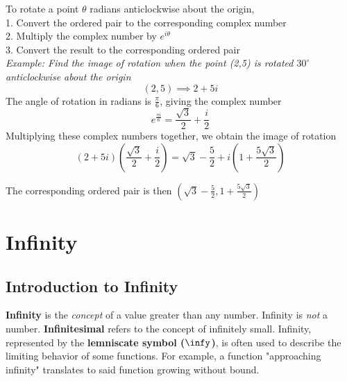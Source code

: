\documentclass{article}
\begin{document}
            \noindent To rotate a point $\theta$ radians anticlockwise about the origin, \\
            1. Convert the ordered pair to the corresponding complex number \\
            2. Multiply the complex number by $e^{i\theta}$ \\
            3. Convert the result to the corresponding ordered pair \\

            \noindent \textit{Example: Find the image of rotation when the point (2,5) is rotated
            $30^\circ$ anticlockwise about the origin} \\
            \begin{equation*}
                (2,5)\implies 2+5i
            \end{equation*}
            \noindent The angle of rotation in radians is $\frac{\pi}{6}$, giving the complex number \\
            \begin{equation*}
                e^{\frac{\pi i}{6}}=\frac{\sqrt{3}}{2}+\frac{i}{2}
            \end{equation*}
            \noindent Multiplying these complex numbers together, we obtain the image of rotation \\
            \begin{equation*}
                \left ( 2+5i\right )\left (\frac{\sqrt{3}}{2}+\frac{i}{2}\right)
                =
                \sqrt{3}-\frac{5}{2}+i \left (1+\frac{5\sqrt{3}}{2} \right )
            \end{equation*}

            \noindent The corresponding ordered pair is then
            $\left(\sqrt{3}-\frac{5}{2},1+\frac{5\sqrt{3}}{2}\right)$

    \pagebreak

    \section{Infinity}

        \subsection{Introduction to Infinity}
            \textbf{Infinity} is the \textit{concept} of a value greater than any number.
            Infinity is \textit{not} a number. \textbf{Infinitesimal} refers to the concept of
            infinitely small. Infinity, represented by the \textbf{lemniscate symbol ($\infy$)}, is
            often used to describe the limiting behavior of some functions. For example, a function
            "approaching infinity" translates to said function growing without bound.
\end{document}
